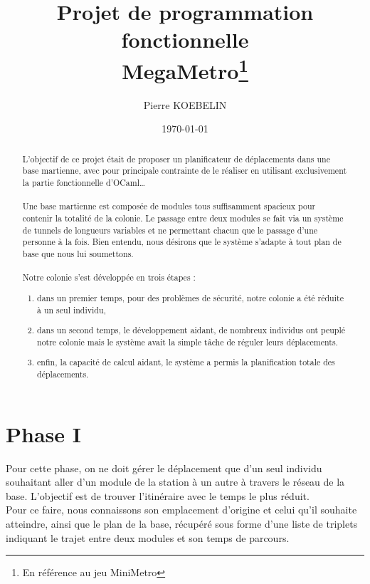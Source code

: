 \documentclass[11pt, a4paper, twoside, titlepage]{article}
\begin{document}
\title{{\titlefont Projet de programmation fonctionnelle}\\MegaMetro\thanks{En référence au jeu MiniMetro}}
\author{Pierre KOEBELIN}
\date{\today} 
\maketitle


\begin{abstract}

L'objectif de ce projet était de proposer un planificateur de déplacements dans une base martienne, avec pour principale contrainte de le réaliser en utilisant exclusivement la partie fonctionnelle d'OCaml\ldots\\
\\
Une base martienne est composée de modules tous suffisamment spacieux pour contenir la totalité de la colonie. Le passage entre deux modules se fait via un système de tunnels de longueurs variables et ne permettant chacun que le passage d'une personne à la fois. Bien entendu, nous désirons que le système s'adapte à tout plan de base que nous lui soumettons.\\
\\
Notre colonie s'est développée en trois étapes :
\begin{enumerate}
\item dans un premier temps, pour des problèmes de sécurité, notre colonie a été réduite à un seul individu,
\item dans un second temps, le développement aidant, de nombreux individus ont peuplé notre colonie mais le système avait la simple tâche de réguler leurs déplacements.
\item enfin, la capacité de calcul aidant, le système a permis la planification totale des déplacements.
\end{enumerate}

\end{abstract}


\tableofcontents


\newpage
\section{Phase I}

Pour cette phase, on ne doit gérer le déplacement que d'un seul individu souhaitant aller d'un module de la station à un autre à travers le réseau de la base. L'objectif est de trouver l'itinéraire avec le temps le plus réduit.\\
Pour ce faire, nous connaissons son emplacement d'origine et celui qu'il souhaite atteindre, ainsi que le plan de la base, récupéré sous forme d'une liste de triplets indiquant le trajet entre deux modules et son temps de parcours.\\
\end{document}
